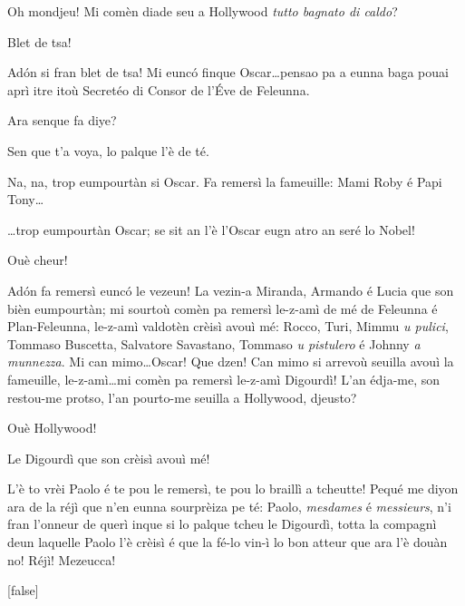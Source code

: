 \begin{drama}
\Cimaspeaks Oh mondjeu! Mi comèn diade seu a Hollywood \og \textit{tutto bagnato di caldo}\fg{}?

\Conducteurspeaks Blet de tsa!

\Cimaspeaks Ad\'on si fran blet de tsa!  Mi eunc\'o finque Oscar\ldots pensao pa a eunna baga pouai aprì itre itoù Secretéo di Consor de l'\'Eve de Feleunna.


\Cimaspeaks Ara senque fa diye?

\Conducteurspeaks Sen que t'a voya, lo palque l'è de té.

\Cimaspeaks{} Na, na, trop eumpourtàn si Oscar. Fa remersì la fameuille: Mami Roby é Papi Tony\ldots 


\Cimaspeaks \ldots trop eumpourtàn Oscar; se sit an l'è l'Oscar eugn atro an seré lo Nobel!

\Conducteurspeaks Ouè cheur!

 \Cimaspeaks{} Ad\'on fa remersì euncó le vezeun! La vezin-a Miranda, Armando é Lucia que son bièn eumpourtàn; mi sourtoù comèn pa remersì le-z-amì de mé de Feleunna é Plan-Feleunna, le-z-amì valdotèn crèisì avouì mé: Rocco, Turi, Mimmu \textit{u pulici}, Tommaso Buscetta, Salvatore Savastano, Tommaso \textit{u pistulero} é Johnny \textit{a munnezza}. Mi can mimo\ldots Oscar! Que dzen! Can mimo si arrevoù seuilla avouì la fameuille, le-z-amì\ldots mi comèn pa remersì le-z-amì Digourdì! L'an édja-me, son restou-me protso, l'an pourto-me seuilla a Hollywood, djeusto?

\Conducteurspeaks Ouè Hollywood!

\Cimaspeaks Le Digourdì que son crèisì avouì mé!

\Conducteurspeaks L'è to vrèi Paolo é te pou le remersì, te pou lo braillì a tcheutte! Pequé me diyon ara de la réjì que n'en eunna sourprèiza pe té: Paolo, \textit{mesdames} é \textit{messieurs}, n'i fran l'onneur de querì inque si lo palque tcheu le Digourdì, totta la compagnì deun laquelle Paolo l'è crèisì é que la fé-lo vin-ì lo bon atteur que ara l'è douàn no! Réjì! Mezeucca!

[false]



\end{drama}
